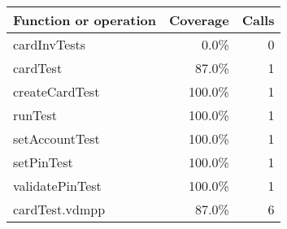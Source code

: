 \documentclass[a4paper]{article}
\begin{document}
\bigskip
\begin{longtable}{|l|r|r|}
\hline
Function or operation & Coverage & Calls \\
\hline
\hline
cardInvTests & 0.0\% & 0 \\
\hline
cardTest & 87.0\% & 1 \\
\hline
createCardTest & 100.0\% & 1 \\
\hline
runTest & 100.0\% & 1 \\
\hline
setAccountTest & 100.0\% & 1 \\
\hline
setPinTest & 100.0\% & 1 \\
\hline
validatePinTest & 100.0\% & 1 \\
\hline
\hline
cardTest.vdmpp & 87.0\% & 6 \\
\hline
\end{longtable}
\end{document}
